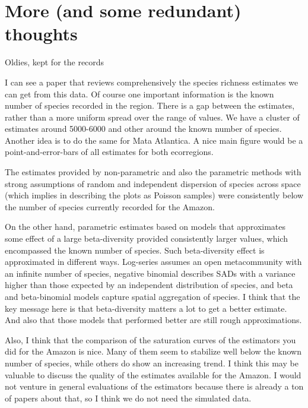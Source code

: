 \documentclass[12pt, A4]{article}\usepackage[]{graphicx}\usepackage[]{color}
\begin{document}
\section*{More (and some redundant) thoughts}

Oldies, kept for the records

I can see a paper that reviews comprehensively the species richness estimates we can get from this data. Of course one important information is the known number of species recorded in the region. There is a gap between the estimates, rather than a more uniform spread over the range of values. We have a cluster of estimates around 5000-6000 and other around the known number of species. Another idea is to do the same for Mata Atlantica.  A nice main figure would be a point-and-error-bars of all estimates for both ecorregions.

The estimates provided by non-parametric and
also the parametric methods with strong assumptions of random and independent dispersion of species
across space (which implies in describing the plots as Poisson samples) were
consistently below the number of species currently recorded for the Amazon.

On the other hand, parametric estimates based on models that
approximates some  effect of a large beta-diversity 
provided consistently larger
values, which encompassed the known number of species. 
Such beta-diversity effect is approximated in different ways.
Log-series assumes an open metacommunity with an infinite number of species,
negative binomial describes SADs with a variance higher than those expected
by an independent distribution of species, and beta and beta-binomial models
capture spatial aggregation of species. 
I think that the key message here 
is that beta-diversity matters a lot to get a better estimate. And also
that those models that performed better are still rough approximations.

Also, I think that the comparison of the saturation curves of the estimators you did 
for the Amazon is nice. 
Many of them seem to stabilize well below the known number of species, 
while others do show an increasing trend. I think this may be valuable
to discuss the quality of the estimates available for the Amazon. 
I would not venture in general evaluations of the estimators because
there is already a ton of papers about that, so I think we do not
need the simulated data.
\end{document}
